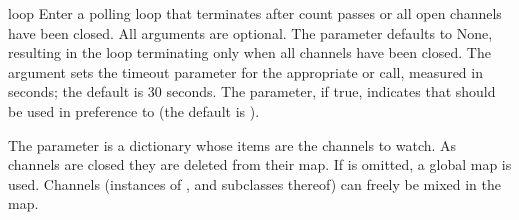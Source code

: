 \begin{funcdesc}{loop}{}
  Enter a polling loop that terminates after count passes or all open
  channels have been closed.  All arguments are optional.  The 
  parameter defaults to None, resulting in the loop terminating only
  when all channels have been closed.  The  argument sets the
  timeout parameter for the appropriate  or
   call, measured in seconds; the default is 30 seconds.
  The  parameter, if true, indicates that 
  should be used in preference to  (the default is
  ).  

  The  parameter is a dictionary whose items are
  the channels to watch.  As channels are closed they are deleted from their
  map.  If  is omitted, a global map is used.
  Channels (instances of , 
  and subclasses thereof) can freely be mixed in the map.
\end{funcdesc}


